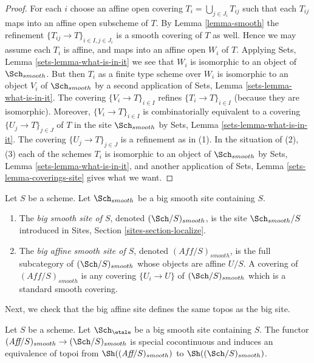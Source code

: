 \begin{proof}
For each $i$ choose an affine open covering $T_i = \bigcup_{j \in J_i} T_{ij}$
such that each $T_{ij}$ maps into an affine open subscheme of $T$. By
Lemma \ref{lemma-smooth}
the refinement $\{T_{ij} \to T\}_{i \in I, j \in J_i}$ is a smooth covering
of $T$ as well. Hence we may assume each $T_i$ is affine, and maps into
an affine open $W_i$ of $T$. Applying
Sets, Lemma \ref{sets-lemma-what-is-in-it}
we see that $W_i$ is isomorphic to an object of $\Sch_{smooth}$.
But then $T_i$ as a finite type scheme over $W_i$
is isomorphic to an object $V_i$ of $\Sch_{smooth}$ by a second
application of
Sets, Lemma \ref{sets-lemma-what-is-in-it}.
The covering $\{V_i \to T\}_{i \in I}$ refines $\{T_i \to T\}_{i \in I}$
(because they are isomorphic).
Moreover, $\{V_i \to T\}_{i \in I}$ is combinatorially equivalent to a
covering $\{U_j \to T\}_{j \in J}$ of $T$ in the site
$\Sch_{smooth}$ by
Sets, Lemma \ref{sets-lemma-what-is-in-it}.
The covering $\{U_j \to T\}_{j \in J}$ is a refinement as in (1).
In the situation of (2), (3) each of the
schemes $T_i$ is isomorphic to an object of $\Sch_{smooth}$ by
Sets, Lemma \ref{sets-lemma-what-is-in-it},
and another application of
Sets, Lemma \ref{sets-lemma-coverings-site}
gives what we want.
\end{proof}

\begin{definition}
\label{definition-big-small-smooth}
Let $S$ be a scheme. Let $\Sch_{smooth}$ be a big smooth
site containing $S$.
\begin{enumerate}
\item The {\it big smooth site of $S$}, denoted
$(\Sch/S)_{smooth}$, is the site $\Sch_{smooth}/S$
introduced in Sites, Section \ref{sites-section-localize}.
\item The {\it big affine smooth site of $S$}, denoted
$(\textit{Aff}/S)_{smooth}$, is the full subcategory of
$(\Sch/S)_{smooth}$ whose objects are affine $U/S$.
A covering of $(\textit{Aff}/S)_{smooth}$ is any covering
$\{U_i \to U\}$ of $(\Sch/S)_{smooth}$ which is a
standard smooth covering.
\end{enumerate}
\end{definition}

\noindent
Next, we check that the big affine site defines the same
topos as the big site.

\begin{lemma}
\label{lemma-affine-big-site-smooth}
Let $S$ be a scheme. Let $\Sch_\etale$ be a big smooth
site containing $S$.
The functor
$(\textit{Aff}/S)_{smooth} \to (\Sch/S)_{smooth}$
is special cocontinuous and induces an equivalence of topoi from
$\Sh((\textit{Aff}/S)_{smooth})$ to
$\Sh((\Sch/S)_{smooth})$.
\end{lemma}

